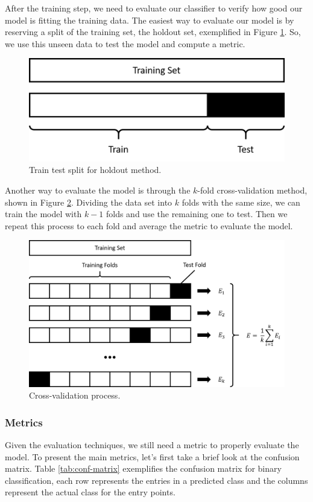 	After the training step, we need to evaluate our classifier to verify how good our model is fitting the training data. The easiest way to evaluate our model is by reserving a split of the training set, the holdout set, exemplified in Figure \ref{fig:holdout-evaluate}. So, we use this unseen data to test the model and compute a metric.
	
	\begin{figure}[h!]
		\centering
		\includegraphics[width=0.4\linewidth]{01.Chapters/02.Background/holdout-evaluate}
		\caption{Train test split for holdout method.}
		\label{fig:holdout-evaluate}
	\end{figure}

	Another way to evaluate the model is through the $k$-fold cross-validation method, shown in Figure \ref{fig:cross-validate}. Dividing the data set into $k$ folds with the same size, we can train the model with $k-1$ folds and use the remaining one to test. Then we repeat this process to each fold and average the metric to evaluate the model.

	\begin{figure}[h!]
		\centering
		\includegraphics[width=0.55\linewidth]{01.Chapters/02.Background/cross-validate}
		\caption{Cross-validation process.}
		\label{fig:cross-validate}
	\end{figure}
	
	\subsubsection{Metrics}
	\label{sub-sub:metrics}

	Given the evaluation techniques, we still need a metric to properly evaluate the model. To present the main metrics, let's first take a brief look at the confusion matrix. Table \ref{tab:conf-matrix} exemplifies the confusion matrix for binary classification, each row represents the entries in a predicted class and the columns represent the actual class for the entry points.
	

